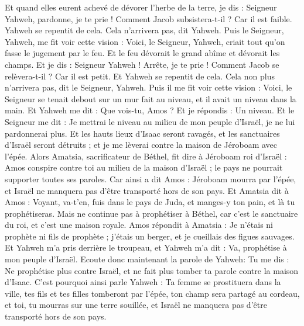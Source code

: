 \begin{multicols}{2}
Et quand elles eurent achevé de dévorer l'herbe de la terre, je dis : Seigneur Yahweh, pardonne, je te prie ! Comment Jacob subsistera-t-il ? Car il est faible.
Yahweh se repentit de cela. Cela n'arrivera pas, dit Yahweh.
Puis le Seigneur, Yahweh, me fit voir cette vision : Voici, le Seigneur, Yahweh, criait tout qu'on fasse le jugement par le feu. Et le feu dévorait le grand abîme et dévorait les champs.
Et je dis : Seigneur Yahweh ! Arrête, je te prie ! Comment Jacob se relèvera-t-il ? Car il est petit.
Et Yahweh se repentit de cela. Cela non plus n'arrivera pas, dit le Seigneur, Yahweh.
Puis il me fit voir cette vision : Voici, le Seigneur se tenait debout sur un mur fait au niveau, et il avait un niveau dans la main.
Et Yahweh me dit : Que vois-tu, Amos ? Et je répondis : Un niveau. Et le Seigneur me dit : Je mettrai le niveau au milieu de mon peuple d'Israël, je ne lui pardonnerai plus.
Et les hauts lieux d'Isaac seront ravagés, et les sanctuaires d'Israël seront détruits ; et je me lèverai contre la maison de Jéroboam avec l'épée.
Alors Amatsia, sacrificateur de Béthel, fit dire à Jéroboam roi d'Israël : Amos conspire contre toi au milieu de la maison d'Israël ; le pays ne pourrait supporter toutes ses paroles.
Car ainsi a dit Amos : Jéroboam mourra par l'épée, et Israël ne manquera pas d'être transporté hors de son pays.
Et Amatsia dit à Amos : Voyant, va-t'en, fuis dans le pays de Juda, et manges-y ton pain, et là tu prophétiseras.
Mais ne continue pas à prophétiser à Béthel, car c'est le sanctuaire du roi, et c'est une maison royale.
Amos répondit à Amatsia : Je n'étais ni prophète ni fils de prophète ; j'étais un berger, et je cueillais des figues sauvages.
Et Yahweh m'a pris derrière le troupeau, et Yahweh m'a dit : Va, prophétise à mon peuple d'Israël.
Ecoute donc maintenant la parole de Yahweh: Tu me dis : Ne prophétise plus contre Israël, et ne fait plus tomber ta parole contre la maison d'Isaac.
C'est pourquoi ainsi parle Yahweh : Ta femme se prostituera dans la ville, tes fils et tes filles tomberont par l'épée, ton champ sera partagé au cordeau, et toi, tu mourras sur une terre souillée, et Israël ne manquera pas d'être transporté hors de son pays.

\end{multicols}
